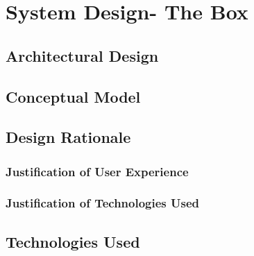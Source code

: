 \chapter{System Design- The Box}

\section{Architectural Design}
\section{Conceptual Model}
\section{Design Rationale}
\subsection{Justification of User Experience}
\subsection{Justification of Technologies Used}
\section{Technologies Used}